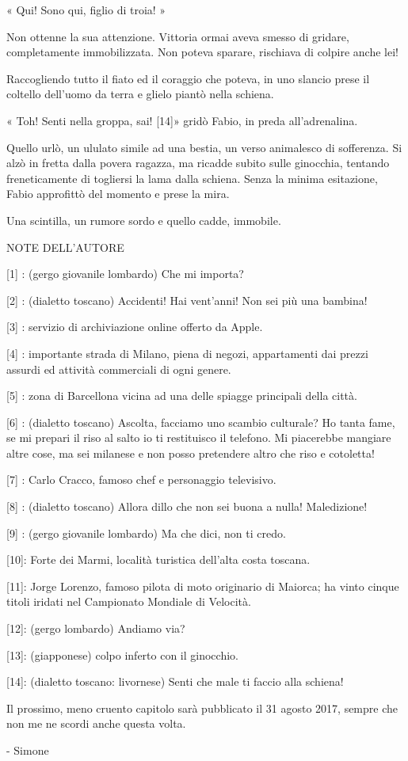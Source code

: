 « Qui! Sono qui, figlio di troia! »

Non ottenne la sua attenzione. Vittoria ormai aveva smesso di gridare, completamente immobilizzata. Non poteva sparare, rischiava di colpire anche lei!

Raccogliendo tutto il fiato ed il coraggio che poteva, in uno slancio prese il coltello dell'uomo da terra e glielo piantò nella schiena.

« Toh! Senti nella groppa, sai! [14]» gridò Fabio, in preda all'adrenalina.

Quello urlò, un ululato simile ad una bestia, un verso animalesco di sofferenza. Si alzò in fretta dalla povera ragazza, ma ricadde subito sulle ginocchia, tentando freneticamente di togliersi la lama dalla schiena. Senza la minima esitazione, Fabio approfittò del momento e prese la mira.

Una scintilla, un rumore sordo e quello cadde, immobile.

NOTE DELL'AUTORE

[1] : (gergo giovanile lombardo) Che mi importa?

[2] : (dialetto toscano) Accidenti! Hai vent'anni! Non sei più una bambina!

[3] : servizio di archiviazione online offerto da Apple.

[4] : importante strada di Milano, piena di negozi, appartamenti dai prezzi assurdi ed attività commerciali di ogni genere.

[5] : zona di Barcellona vicina ad una delle spiagge principali della città.

[6] : (dialetto toscano) Ascolta, facciamo uno scambio culturale? Ho tanta fame, se mi prepari il riso al salto io ti restituisco il telefono. Mi piacerebbe mangiare altre cose, ma sei milanese e non posso pretendere altro che riso e cotoletta!

[7] : Carlo Cracco, famoso chef e personaggio televisivo.

[8] : (dialetto toscano) Allora dillo che non sei buona a nulla! Maledizione!

[9] : (gergo giovanile lombardo) Ma che dici, non ti credo.

[10]: Forte dei Marmi, località turistica dell'alta costa toscana.

[11]: Jorge Lorenzo, famoso pilota di moto originario di Maiorca; ha vinto cinque titoli iridati nel Campionato Mondiale di Velocità.

[12]: (gergo lombardo) Andiamo via?

[13]: (giapponese) colpo inferto con il ginocchio.

[14]: (dialetto toscano: livornese) Senti che male ti faccio alla schiena!

Il prossimo, meno cruento capitolo sarà pubblicato il 31 agosto 2017, sempre che non me ne scordi anche questa volta.

- Simone



